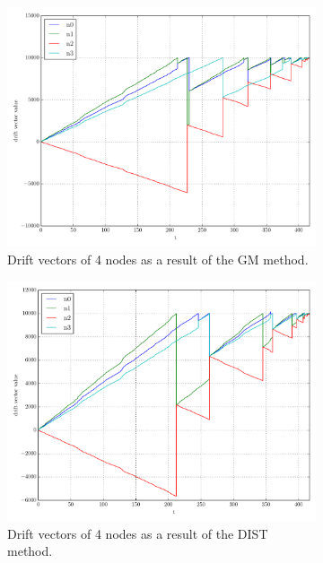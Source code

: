 \begin{figure}[!b]
\begin{subfigure}{0.32\textwidth}
  \includegraphics[width=\linewidth]{img/matchings_classic_random_drifts.pdf}
  \caption{Drift vectors of 4 nodes as a result of the GM method.}
\end{subfigure}\hfill
\begin{subfigure}{0.32\textwidth}
  \includegraphics[width=\linewidth]{img/matchings_classic_distoptpair_drifts.pdf}
  \caption{Drift vectors of 4 nodes as a result of the DIST method.}
\end{subfigure}\hfill
\begin{subfigure}{0.32\textwidth}%

\end{subfigure}
\end{figure}
